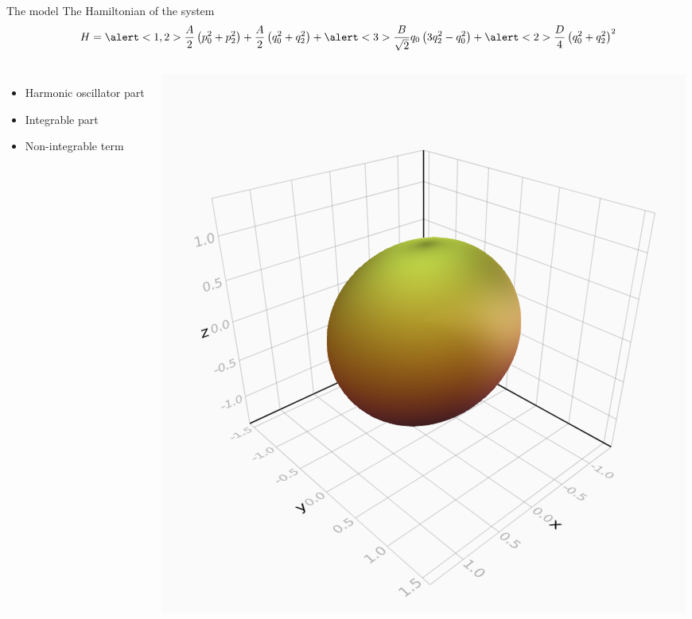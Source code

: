 \documentclass{beamer}
\begin{document}
\begin{frame}{The model}
	The Hamiltonian of the system
	\begin{equation*}
    H = \alert<1,2>{\frac{A}{2}\left(p_0^2+p_2^2\right)+\frac{A}{2}\left(q_0^2+q_2^2\right)}
		 +\alert<3>{\frac{B}{\sqrt{2}}q_0\left(3q_2^2-q_0^2\right)}
		 +\alert<2>{\frac{D}{4}\left(q_0^2+q_2^2\right)^2}
  \end{equation*}

	\begin{columns}
		\begin{itemize}
			\item \alert<1> {Harmonic oscillator part}
			\item \alert<2> {Integrable part}
			\item \alert<3> {Non-integrable term}
		\end{itemize}

		\includegraphics[width=\textwidth]{nucleus}
	\end{columns}
\end{frame}

\end{document}
